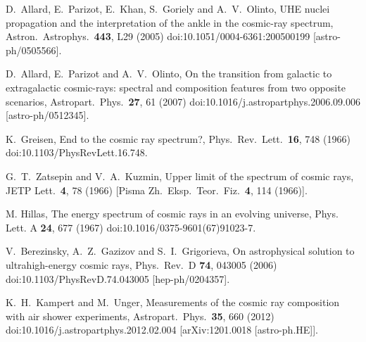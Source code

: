 \documentclass[aps,prd,twocolumn,superscriptaddress,tightenlines,nofootinbib]{revtex4-1}
\begin{document}
\begin{thebibliography}{99}
 D.~Allard, E.~Parizot, E.~Khan, S.~Goriely and
  A.~V.~Olinto, {\color{rossoCP3} UHE nuclei propagation and the
    interpretation of the ankle in the cosmic-ray spectrum}, Astron.\
  Astrophys.\ {\bf 443}, L29 (2005) doi:10.1051/0004-6361:200500199
  [astro-ph/0505566].


  D.~Allard, E.~Parizot and A.~V.~Olinto,
  {\color{rossoCP3} On the transition from galactic to extragalactic cosmic-rays: spectral and composition features from two opposite scenarios},
  Astropart.\ Phys.\  {\bf 27}, 61 (2007)
  doi:10.1016/j.astropartphys.2006.09.006
  [astro-ph/0512345].



  K.~Greisen,
 {\color{rossoCP3} End to the cosmic ray spectrum?},
  Phys.\ Rev.\ Lett.\  {\bf 16}, 748 (1966)
  doi:10.1103/PhysRevLett.16.748.

  G.~T.~Zatsepin and V.~A.~Kuzmin,
  {\color{rossoCP3} Upper limit of the spectrum of cosmic rays},
  JETP Lett.\  {\bf 4}, 78 (1966)
  [Pisma Zh.\ Eksp.\ Teor.\ Fiz.\  {\bf 4}, 114 (1966)].




 M. Hillas,
  {\color{rossoCP3} The energy spectrum of cosmic rays in an evolving universe},
  Phys. Lett. A {\bf 24}, 677 (1967)
doi:10.1016/0375-9601(67)91023-7.



  V.~Berezinsky, A.~Z.~Gazizov and S.~I.~Grigorieva,
  {\color{rossoCP3} On astrophysical solution to ultrahigh-energy cosmic rays},
  Phys.\ Rev.\ D {\bf 74}, 043005 (2006)
  doi:10.1103/PhysRevD.74.043005
  [hep-ph/0204357].










  K.~H.~Kampert and M.~Unger,
  {\color{rossoCP3} Measurements of the cosmic ray composition with air shower experiments},
  Astropart.\ Phys.\  {\bf 35}, 660 (2012)
  doi:10.1016/j.astropartphys.2012.02.004
  [arXiv:1201.0018 [astro-ph.HE]].



\end{thebibliography}
\end{document}
